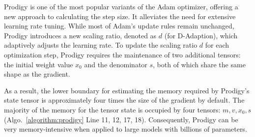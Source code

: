 Prodigy is one of the most popular variants of the Adam optimizer, offering a new approach to calculating the step size. It alleviates the need for extensive learning rate tuning. While most of Adam's update rules remain unchanged, Prodigy introduces a new scaling ratio, denoted as $d$ (for D-Adaption), which adaptively adjusts the learning rate. To update the scaling ratio $d$ for each optimization step, Prodigy requires the maintenance of two additional tensors: the initial weight value $x_0$ and the denominator $s$, both of which share the same shape as the gradient.

As a result, the lower boundary for estimating the memory required by Prodigy's state tensor is approximately four times the size of the gradient by default. The majority of the memory for the tensor state is occupied by four tensors: $m, v, x_0, s$ (Algo.~\ref{algorithm:prodigy} Line 11, 12, 17, 18). Consequently, Prodigy can be very memory-intensive when applied to large models with billions of parameters.


